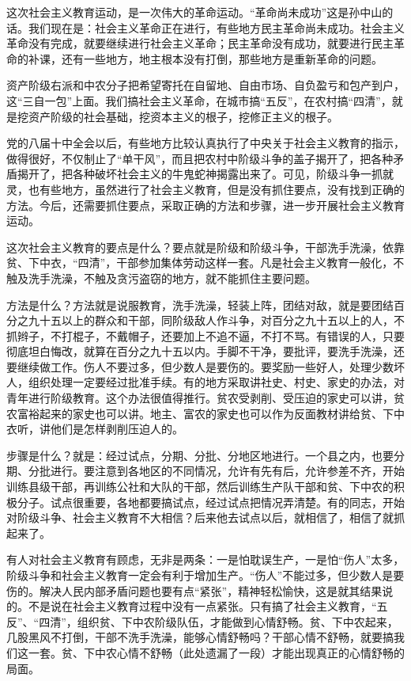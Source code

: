这次社会主义教育运动，是一次伟大的革命运动。“革命尚未成功”这是孙中山的话。我们现在是：社会主义革命正在进行，有些地方民主革命尚未成功。社会主义革命没有完成，就要继续进行社会主义革命；民主革命没有成功，就要进行民主革命的补课，还有一些地方，地主根本没有打倒，那些地方是重新革命的问题。

资产阶级右派和中农分子把希望寄托在自留地、自由市场、自负盈亏和包产到户，这“三自一包”上面。我们搞社会主义革命，在城市搞“五反”，在农村搞“四清”，就是挖资产阶级的社会基础，挖资本主义的根子，挖修正主义的根子。

党的八届十中全会以后，有些地方比较认真执行了中央关于社会主义教育的指示，做得很好，不仅制止了“单干风”，而且把农村中阶级斗争的盖子揭开了，把各种矛盾揭开了，把各种破坏社会主义的牛鬼蛇神揭露出来了。可见，阶级斗争一抓就灵，也有些地方，虽然进行了社会主义教育，但是没有抓住要点，没有找到正确的方法。今后，还需要抓住要点，采取正确的方法和步骤，进一步开展社会主义教育运动。

这次社会主义教育的要点是什么？要点就是阶级和阶级斗争，干部洗手洗澡，依靠贫、下中衣，“四清”，干部参加集体劳动这样一套。凡是社会主义教育一般化，不触及洗手洗澡，不触及贪污盗窃的地方，就不能抓住主要问题。

方法是什么？方法就是说服教育，洗手洗澡，轻装上阵，团结对敌，就是要团结百分之九十五以上的群众和干部，同阶级敌人作斗争，对百分之九十五以上的人，不抓辫子，不打棍子，不戴帽子，还要加上不追不逼，不打不骂。有错误的人，只要彻底坦白悔改，就算在百分之九十五以内。手脚不干净，要批评，要洗手洗澡，还要继续做工作。伤人不要过多，但少数人是要伤的。要奖励一些好人，处理少数坏人，组织处理一定要经过批准手续。有的地方采取讲社史、村史、家史的办法，对青年进行阶级教育。这个办法很值得推行。贫农受剥削、受压迫的家史可以讲，贫农富裕起来的家史也可以讲。地主、富农的家史也可以作为反面教材讲给贫、下中衣听，讲他们是怎样剥削压迫人的。

步骤是什么？就是：经过试点，分期、分批、分地区地进行。一个县之内，也要分期、分批进行。要注意到各地区的不同情况，允许有先有后，允许参差不齐，开始训练县级干部，再训练公社和大队的干部，然后训练生产队干部和贫、下中农的积极分子。试点很重要，各地都要搞试点，经过试点把情况弄清楚。有的同志，开始对阶级斗争、社会主义教育不大相信？后来他去试点以后，就相信了，相信了就抓起来了。

有人对社会主义教育有顾虑，无非是两条：一是怕耽误生产，一是怕“伤人”太多，阶级斗争和社会主义教育一定会有利于增加生产。“伤人”不能过多，但少数人是要伤的。解决人民内部矛盾问题也要有点“紧张”，精神轻松愉快，这是就其结果说的。不是说在社会主义教育过程中没有一点紧张。只有搞了社会主义教育，“五反”、“四清”，组织贫、下中农阶级队伍，才能做到心情舒畅。贫、下中农起来，几股黑风不打倒，干部不洗手洗澡，能够心情舒畅吗？干部心情不舒畅，就要搞我们这一套。贫、下中农心情不舒畅（此处遗漏了一段）才能出现真正的心情舒畅的局面。

